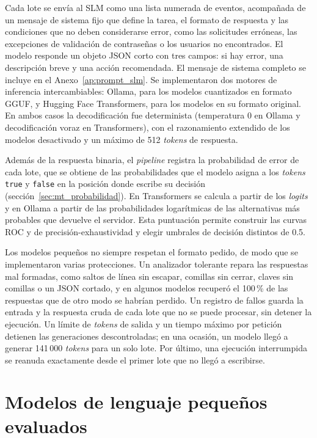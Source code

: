 Cada lote se envía al SLM como una lista numerada de eventos, acompañada de un mensaje de sistema fijo que define la tarea, el formato de respuesta y las condiciones que no deben considerarse error, como las solicitudes erróneas, las excepciones de validación de contraseñas o los usuarios no encontrados. El modelo responde un objeto JSON corto con tres campos: si hay error, una descripción breve y una acción recomendada. El mensaje de sistema completo se incluye en el Anexo~\ref{ap:prompt_slm}. Se implementaron dos motores de inferencia intercambiables: Ollama, para los modelos cuantizados en formato GGUF, y Hugging Face Transformers, para los modelos en su formato original. En ambos casos la decodificación fue determinista (temperatura 0 en Ollama y decodificación voraz en Transformers), con el razonamiento extendido de los modelos desactivado y un máximo de 512 \textit{tokens} de respuesta.


Además de la respuesta binaria, el \textit{pipeline} registra la probabilidad de error de cada lote, que se obtiene de las probabilidades que el modelo asigna a los \textit{tokens} \texttt{true} y \texttt{false} en la posición donde escribe su decisión (sección~\ref{sec:mt_probabilidad}). En Transformers se calcula a partir de los \textit{logits} y en Ollama a partir de las probabilidades logarítmicas de las alternativas más probables que devuelve el servidor. Esta puntuación permite construir las curvas ROC y de precisión-exhaustividad y elegir umbrales de decisión distintos de 0.5.


Los modelos pequeños no siempre respetan el formato pedido, de modo que se implementaron varias protecciones. Un analizador tolerante repara las respuestas mal formadas, como saltos de línea sin escapar, comillas sin cerrar, claves sin comillas o un JSON cortado, y en algunos modelos recuperó el 100\,\% de las respuestas que de otro modo se habrían perdido. Un registro de fallos guarda la entrada y la respuesta cruda de cada lote que no se puede procesar, sin detener la ejecución. Un límite de \textit{tokens} de salida y un tiempo máximo por petición detienen las generaciones descontroladas; en una ocasión, un modelo llegó a generar 141\,000 \textit{tokens} para un solo lote. Por último, una ejecución interrumpida se reanuda exactamente desde el primer lote que no llegó a escribirse.

\section{Modelos de lenguaje pequeños evaluados}\label{sec:met_slm}

